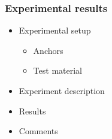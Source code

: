 \begin{frame}
	\frametitle{Experimental results}
	
\begin{itemize}
	\item Experimental setup
	
\begin{itemize}
	\item Anchors
	\item Test material
\end{itemize}
	\item Experiment description
	\item Results
	\item Comments
\end{itemize}
\end{frame}